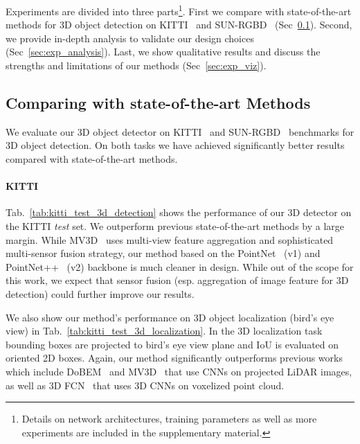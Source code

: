 Experiments are divided into three parts\footnote{Details on network architectures, training parameters as well as more experiments are included in the supplementary material.}. First we compare with state-of-the-art methods for 3D object detection on KITTI~\cite{geiger2013vision} and SUN-RGBD~\cite{song2015sun} (Sec~\ref{sec:exp_benchmark}). Second, we provide in-depth analysis to validate our design choices (Sec~\ref{sec:exp_analysis}). Last, we show qualitative results and discuss the strengths and limitations of our methods (Sec~\ref{sec:exp_viz}).


\subsection{Comparing with state-of-the-art Methods} \label{sec:exp_benchmark}
We evaluate our 3D object detector on KITTI~\cite{Geiger2012CVPR} and SUN-RGBD~\cite{song2015sun} benchmarks for 3D object detection. On both tasks we have achieved significantly better results compared with state-of-the-art methods.


\paragraph{KITTI} Tab.~\ref{tab:kitti_test_3d_detection} shows the performance of our 3D detector on the KITTI \emph{test} set. We outperform previous state-of-the-art methods by a large margin. While MV3D~\cite{cvpr17chen} uses multi-view feature aggregation and sophisticated multi-sensor fusion strategy, our method based on the PointNet~\cite{qi2017pointnet} (v1) and PointNet++~\cite{qi2017pointnetplusplus} (v2) backbone is much cleaner in design. While out of the scope for this work, we expect that sensor fusion (esp. aggregation of image feature for 3D detection) could further improve our results.

We also show our method's performance on 3D object localization (bird's eye view) in Tab.~\ref{tab:kitti_test_3d_localization}. In the 3D localization task bounding boxes are projected to bird's eye view plane and IoU is evaluated on oriented 2D boxes. Again, our method significantly outperforms previous works which include DoBEM~\cite{yuvehicle} and MV3D~\cite{cvpr17chen} that use CNNs on projected LiDAR images, as well as 3D FCN~\cite{li20163d} that uses 3D CNNs on voxelized point cloud. 

